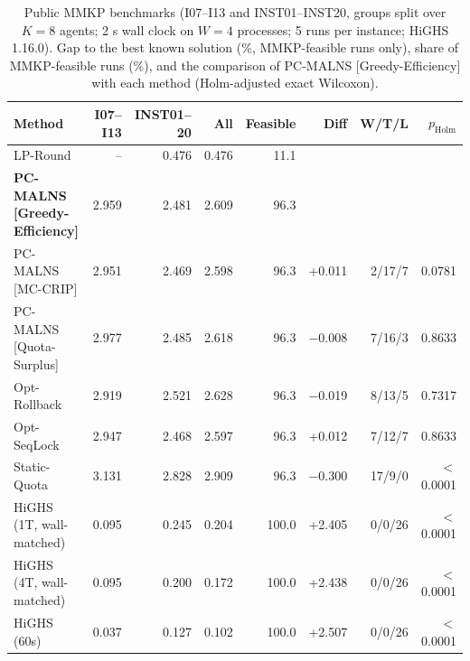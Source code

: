 \begin{table}[pos=!htb]
\centering
\caption{Public MMKP benchmarks (I07--I13 and INST01--INST20, groups split over $K = 8$ agents; 2 s wall clock on $W = 4$ processes; 5 runs per instance; HiGHS 1.16.0). Gap to the best known solution (\%, MMKP-feasible runs only), share of MMKP-feasible runs (\%), and the comparison of PC-MALNS [Greedy-Efficiency] with each method (Holm-adjusted exact Wilcoxon).}
\label{tab:mmkp}
\scriptsize
\begin{tabular}{@{}lrrrrrrr@{}}
\toprule
Method & I07--I13 & INST01--20 & All & Feasible & Diff & W/T/L & $p_{\text{Holm}}$ \\
\midrule
LP-Round & -- & 0.476 & 0.476 & 11.1 &  &  &  \\
\textbf{PC-MALNS [Greedy-Efficiency]} & 2.959 & 2.481 & 2.609 & 96.3 &  &  &  \\
PC-MALNS [MC-CRIP] & 2.951 & 2.469 & 2.598 & 96.3 & +0.011 & 2/17/7 & 0.0781 \\
PC-MALNS [Quota-Surplus] & 2.977 & 2.485 & 2.618 & 96.3 & $-$0.008 & 7/16/3 & 0.8633 \\
Opt-Rollback & 2.919 & 2.521 & 2.628 & 96.3 & $-$0.019 & 8/13/5 & 0.7317 \\
Opt-SeqLock & 2.947 & 2.468 & 2.597 & 96.3 & +0.012 & 7/12/7 & 0.8633 \\
Static-Quota & 3.131 & 2.828 & 2.909 & 96.3 & $-$0.300 & 17/9/0 & $<$0.0001 \\
HiGHS (1T, wall-matched) & 0.095 & 0.245 & 0.204 & 100.0 & +2.405 & 0/0/26 & $<$0.0001 \\
HiGHS (4T, wall-matched) & 0.095 & 0.200 & 0.172 & 100.0 & +2.438 & 0/0/26 & $<$0.0001 \\
HiGHS (60s) & 0.037 & 0.127 & 0.102 & 100.0 & +2.507 & 0/0/26 & $<$0.0001 \\
\bottomrule
\end{tabular}
\end{table}

